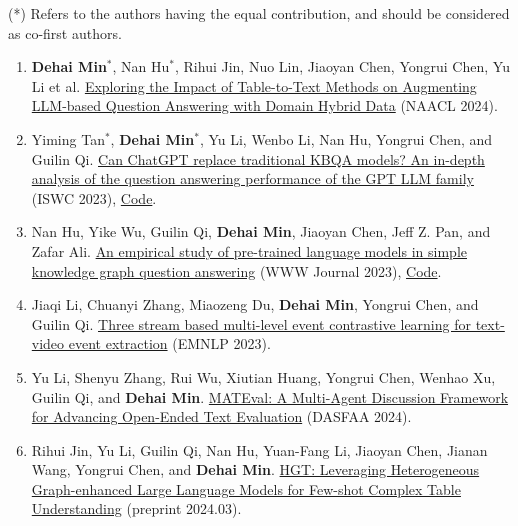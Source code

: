 \documentclass[a4paper,12pt]{article}
\begin{document}
(*) Refers to the authors having the equal contribution, and should be considered as co-first authors.
\begin{enumerate}

\item \textbf{Dehai Min}$^*$, Nan Hu$^*$, Rihui Jin, Nuo Lin, Jiaoyan Chen, Yongrui Chen, Yu Li et al. \href{https://arxiv.org/abs/2402.12869}{Exploring the Impact of Table-to-Text Methods on Augmenting LLM-based Question Answering with Domain Hybrid Data} (NAACL 2024).

\item Yiming Tan$^*$, \textbf{Dehai Min}$^*$, Yu Li, Wenbo Li, Nan Hu, Yongrui Chen, and Guilin Qi. \href{https://link.springer.com/chapter/10.1007/978-3-031-47240-4_19}{Can ChatGPT replace traditional KBQA models? An in-depth analysis of the question answering performance of the GPT LLM family} (ISWC 2023), \href{https://github.com/tan92hl/Complex-Question-Answering-Evaluation-of-GPT-family}{Code}.

\item Nan Hu, Yike Wu, Guilin Qi, \textbf{Dehai Min}, Jiaoyan Chen, Jeff Z. Pan, and Zafar Ali. \href{https://link.springer.com/article/10.1007/s11280-023-01166-y}{An empirical study of pre-trained language models in simple knowledge graph question answering} (WWW Journal 2023), \href{https://github.com/HuuuNan/PLMs-in-Practical-KBQA}{Code}.

\item Jiaqi Li, Chuanyi Zhang, Miaozeng Du, \textbf{Dehai Min}, Yongrui Chen, and Guilin Qi. \href{https://aclanthology.org/2023.emnlp-main.103/}{Three stream based multi-level event contrastive learning for text-video event extraction} (EMNLP 2023).

\item Yu Li, Shenyu Zhang, Rui Wu, Xiutian Huang, Yongrui Chen, Wenhao Xu, Guilin Qi, and \textbf{Dehai Min}. \href{https://arxiv.org/abs/2403.19305}{MATEval: A Multi-Agent Discussion Framework for Advancing Open-Ended Text Evaluation} (DASFAA 2024).

\item Rihui Jin, Yu Li, Guilin Qi, Nan Hu, Yuan-Fang Li, Jiaoyan Chen, Jianan Wang, Yongrui Chen, and \textbf{Dehai Min}. \href{https://arxiv.org/abs/2403.19723}{HGT: Leveraging Heterogeneous Graph-enhanced Large Language Models for Few-shot Complex Table Understanding} (preprint 2024.03).
\end{enumerate}


\end{document}
